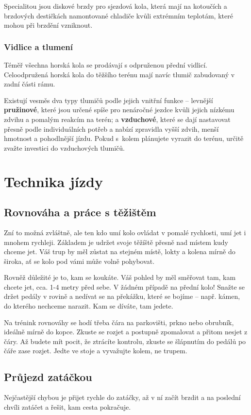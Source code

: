 \documentclass[11pt]{article}
\begin{document}
\noindent{}Specialitou jsou diskové brzdy pro sjezdová kola, která mají na kotoučích a brzdových destičkách namontované chladiče kvůli extrémním teplotám, které mohou při brzdění vzniknout.

\subsubsection*{Vidlice a tlumení}
Téměř všechna horská kola se prodávají s odpruženou přední vidlicí. Celoodpružená horská kola do těžšího terénu mají navíc tlumič zabudovaný v zadní části rámu.

Existují vesměs dva typy tlumičů podle jejich vnitřní funkce – levnější \textbf{pružinové}, které jsou určené spíše pro nenáročné jezdce kvůli jejich nízkému zdvihu a pomalým reakcím na terén; a \textbf{vzduchové}, které se dají nastavovat přesně podle individuálních potřeb a nabízí zpravidla vyšší zdvih, menší hmotnost a pohodlnější jízdu. Pokud s~kolem plánujete vyrazit do terénu, určitě zvažte investici do vzduchových tlumičů.

\newpage\section{Technika jízdy}
\subsection{Rovnováha a práce s těžištěm}
Zní to možná zvláštně, ale ten kdo umí kolo ovládat v pomalé rychlosti, umí jet i mnohem rychleji. Základem je udržet svoje těžíště přesně nad místem kudy chceme jet. Váš trup by měl zůstat na stejném místě, lokty a kolena mírně do široka, ať se kolo pod vámi může volně pohybovat. 

Rovněž důležité je to, kam se koukáte. Váš pohled by měl směřovat tam, kam chcete jet, cca. 1-4 metry před sebe. V žádném případě na přední kolo! 
Snažte se držet pedály v rovině a nedívat se na překážku, které se bojíme – např. kámen, do kterého nechceme narazit. Kam se díváte, tam jedete.

Na trénink rovnováhy se hodí třeba čára na parkovišti, prkno nebo obrubník, ideálně mírně do kopce. Zkuste se rozjet a postupně zpomalovat a přitom nesjet z čáry. Až budete mít pocit, že ztrácíte kontrolu, zkuste se šlápnutím do pedálů po čáře zase rozjet. Jedte ve stoje a vyvažujte kolem, ne trupem.
\subsection[Zatáčení]{Průjezd zatáčkou}
Nejčastější chybou je přijet rychle do zatáčky, až v ní začít brzdit a na poslední chvíli zatáčet a řešit, kam cesta pokračuje. 
\end{document}
